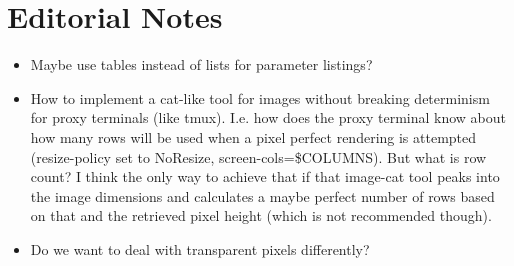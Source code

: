 \documentclass[a4paper]{article}
\begin{document}
\section{Editorial Notes} %

\begin{itemize}
    \item Maybe use tables instead of lists for parameter listings?
    \item How to implement a cat-like tool for images without breaking determinism for proxy
        terminals (like tmux).
        I.e. how does the proxy terminal know about how many rows will be used when
        a pixel perfect rendering is attempted (resize-policy set to NoResize,
        screen-cols=\$COLUMNS). But what is row count?
        I think the only way to achieve that if that image-cat tool peaks into
        the image dimensions and calculates a maybe perfect number of rows
        based on that and the retrieved pixel height (which is not recommended though).
    \item Do we want to deal with transparent pixels differently?
\end{itemize}


\listoftodos
\end{document}
